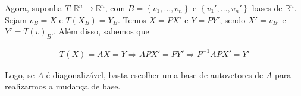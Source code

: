 \documentclass{article}
\begin{document}
\par\vspace{0.3cm} Agora, suponha $T:\mathbb{R}^n\to\mathbb{R}^n$, com $B = \left\{ v_1, \dots, v_n \right\}$ e $\left\{ v_1', \dots, v_n' \right\}$ bases de $\mathbb{R}^n$. Sejam $v_B = X$ e $T(X_B) = Y_B$. Temos $X = PX'$ e $Y = PY'$, sendo $X' = v_{B'}$ e $Y' = T(v)_{B'}$. Além disso, sabemos que

\begin{align*}
T(X) = AX = Y \Rightarrow AP X' = PY' \Rightarrow P^{-1}APX' = Y'
\end{align*}

\par\vspace{0.3cm} Logo, se $A$ é diagonalizável, basta escolher uma base de autovetores de $A$ para realizarmos a mudança de base.
\end{document}
